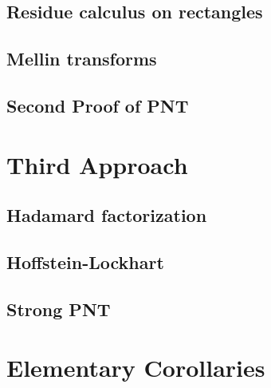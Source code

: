 \documentclass{report}
\theoremstyle{definition}
\begin{document}
\section{Residue calculus on rectangles}


\section{Mellin transforms}


\section{Second Proof of PNT}



\chapter{Third Approach}

\section{Hadamard factorization}


\section{Hoffstein-Lockhart}


\section{Strong PNT}


\chapter{Elementary Corollaries}


\end{document}
